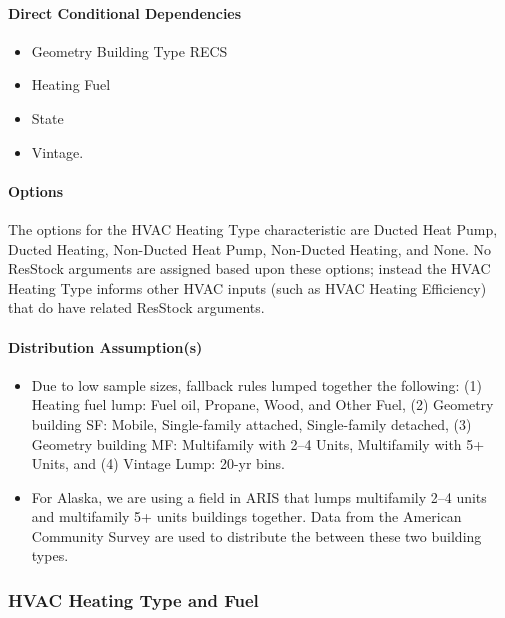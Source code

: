 \paragraph{Direct Conditional Dependencies}
\begin{itemize}
    \item Geometry Building Type RECS
    \item Heating Fuel
    \item State
    \item Vintage.
\end{itemize}

\paragraph{Options} %
The options for the HVAC Heating Type characteristic are Ducted Heat Pump, Ducted Heating, Non-Ducted Heat Pump, Non-Ducted Heating, and None. No ResStock arguments are assigned based upon these options; instead the HVAC Heating Type informs other HVAC inputs (such as HVAC Heating Efficiency) that do have related ResStock arguments.

\paragraph{Distribution Assumption(s)}
\begin{itemize}
    \item Due to low sample sizes, fallback rules lumped together the following: (1) Heating fuel lump: Fuel oil, Propane, Wood, and Other Fuel, (2) Geometry building SF: Mobile, Single-family attached, Single-family detached, (3) Geometry building MF: Multifamily with 2--4 Units, Multifamily with 5+ Units, and (4) Vintage Lump: 20-yr bins.
    \item For Alaska, we are using a field in ARIS that lumps multifamily 2--4 units and multifamily 5+ units buildings together. Data from the American Community Survey are used to distribute the between these two building types.
\end{itemize}
  
\subsubsection{HVAC Heating Type and Fuel}
